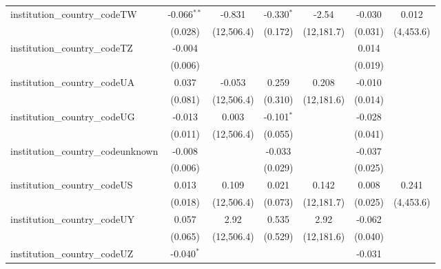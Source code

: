 \begin{tabular}{lcccccc}
   institution\_country\_codeTW          & -0.066$^{**}$  & -0.831        & -0.330$^{*}$  & -2.54         & -0.030        & 0.012\\   
                                         & (0.028)        & (12,506.4)    & (0.172)       & (12,181.7)    & (0.031)       & (4,453.6)\\   
   institution\_country\_codeTZ          & -0.004         &               &               &               & 0.014         &   \\   
                                         & (0.006)        &               &               &               & (0.019)       &   \\   
   institution\_country\_codeUA          & 0.037          & -0.053        & 0.259         & 0.208         & -0.010        &   \\   
                                         & (0.081)        & (12,506.4)    & (0.310)       & (12,181.6)    & (0.014)       &   \\   
   institution\_country\_codeUG          & -0.013         & 0.003         & -0.101$^{*}$  &               & -0.028        &   \\   
                                         & (0.011)        & (12,506.4)    & (0.055)       &               & (0.041)       &   \\   
   institution\_country\_codeunknown     & -0.008         &               & -0.033        &               & -0.037        &   \\   
                                         & (0.006)        &               & (0.029)       &               & (0.025)       &   \\   
   institution\_country\_codeUS          & 0.013          & 0.109         & 0.021         & 0.142         & 0.008         & 0.241\\   
                                         & (0.018)        & (12,506.4)    & (0.073)       & (12,181.7)    & (0.025)       & (4,453.6)\\   
   institution\_country\_codeUY          & 0.057          & 2.92          & 0.535         & 2.92          & -0.062        &   \\   
                                         & (0.065)        & (12,506.4)    & (0.529)       & (12,181.6)    & (0.040)       &   \\   
   institution\_country\_codeUZ          & -0.040$^{*}$   &               &               &               & -0.031        &   \\   

\end{tabular}
